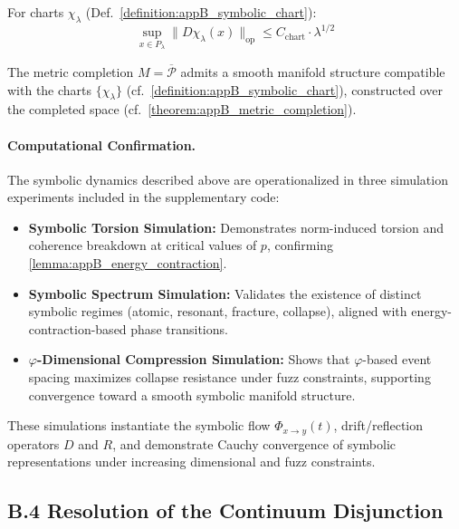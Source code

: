 \begin{lemma}
\label{lemma:appB_chart_bounds}
For charts $\chi_\lambda$ (Def.~\ref{definition:appB_symbolic_chart}):
\[
\sup_{x \in P_\lambda} \|D\chi_\lambda(x)\|_{\text{op}} \leq C_{\text{chart}} \cdot \lambda^{1/2}
\]
\end{lemma}

\begin{theorem}
\label{theorem:appB_smooth_atlas}
The metric completion $M = \overline{\mathcal{P}}$ admits a smooth manifold structure compatible with the charts $\{\chi_\lambda\}$ (cf.~\ref{definition:appB_symbolic_chart}), constructed over the completed space (cf.~\ref{theorem:appB_metric_completion}).
\end{theorem}

\paragraph{Computational Confirmation.}
The symbolic dynamics described above are operationalized in three simulation experiments included in the supplementary code:
\begin{itemize}
  \item \textbf{Symbolic Torsion Simulation:} Demonstrates norm-induced torsion and coherence breakdown at critical values of \( p \), confirming \autoref{lemma:appB_energy_contraction}.
  \item \textbf{Symbolic Spectrum Simulation:} Validates the existence of distinct symbolic regimes (atomic, resonant, fracture, collapse), aligned with energy-contraction-based phase transitions.
  \item \textbf{$\varphi$-Dimensional Compression Simulation:} Shows that $\varphi$-based event spacing maximizes collapse resistance under fuzz constraints, supporting convergence toward a smooth symbolic manifold structure.
\end{itemize}
These simulations instantiate the symbolic flow \( \Phi_{x \to y}(t) \), drift/reflection operators \( D \) and \( R \), and demonstrate Cauchy convergence of symbolic representations under increasing dimensional and fuzz constraints.

\subsection*{B.4 Resolution of the Continuum Disjunction}
\label{subsec:appB_continuum_resolution}

